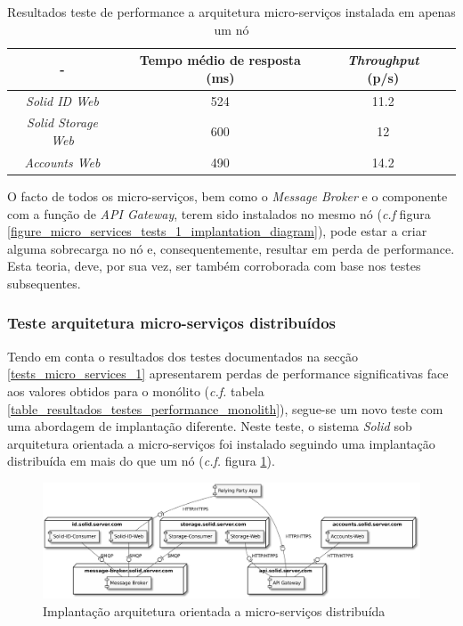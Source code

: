 \begin{table}[h]
\centering
\caption{Resultados teste de performance a arquitetura micro-serviços instalada em apenas um nó}
\label{r_t_m_s_1}
\vspace{0.5cm}
\begin{tabular}{c|c|c|c} 
 - & Tempo médio de resposta (ms) & \emph{Throughput} (p/s) \\
\hline                          
\emph{Solid ID Web} & 524 & 11.2 \\
\emph{Solid Storage Web} & 600 & 12 \\
 \emph{Accounts Web} & 490 & 14.2 \\
\end{tabular}
\end{table}

O facto de todos os micro-serviços, bem como o \emph{Message Broker} e o componente com a função de \emph{API Gateway}, terem sido instalados no mesmo nó (\emph{c.f} figura \ref{figure_micro_services_tests_1_implantation_diagram}), pode estar a criar alguma sobrecarga no nó e, consequentemente, resultar em perda de performance. Esta teoria, deve, por sua vez, ser também corroborada com base nos testes subsequentes.

\subsubsection{Teste arquitetura micro-serviços distribuídos \label{tests_micro_services_2}}

Tendo em conta o resultados dos testes documentados na secção \ref{tests_micro_services_1} apresentarem perdas de performance significativas face aos valores obtidos para o monólito (\emph{c.f.} tabela \ref{table_resultados_testes_performance_monolith}), segue-se um novo teste com uma abordagem de implantação diferente.
Neste teste, o sistema \emph{Solid} sob arquitetura orientada a micro-serviços foi instalado seguindo uma implantação distribuída em mais do que um nó (\emph{c.f.} figura \ref{figure_solid_micro_services_multiples_vps_implantation_diagram}).

\begin{figure}[H]
    \begin{center}
    \includegraphics[width=1 \textwidth]{figures/microservices_tests2.eps}
    \caption{Implantação arquitetura orientada a micro-serviços distribuída}
    \label{figure_solid_micro_services_multiples_vps_implantation_diagram}
    \end{center}
\end{figure}


